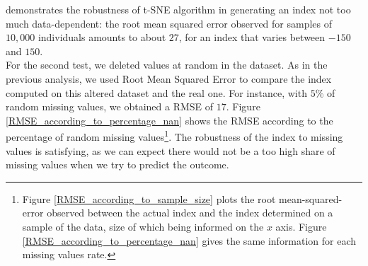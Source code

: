 \documentclass[]{article}
\begin{document}
demonstrates the robustness of t-SNE algorithm in generating an index not too much data-dependent: the root mean squared error observed for samples of $10,000$ individuals amounts to about $27$, for an index that varies between $-150$ and $150$.\\
For the second test, we deleted values at random in the dataset. As in the previous analysis, we used Root Mean Squared Error to compare the index computed on this altered dataset and the real one. For instance, with $5\%$ of random missing values, we obtained a RMSE of $17$. Figure \ref{RMSE_according_to_percentage_nan} shows the RMSE according to the percentage of random missing values\footnote{Figure \ref{RMSE_according_to_sample_size} plots the root mean-squared-error observed between the actual index and the index determined on a sample of the data, size of which being informed on the $x$ axis. Figure \ref{RMSE_according_to_percentage_nan} gives the same information for each missing values rate.}. The robustness of the index to missing values is satisfying, as we can expect there would not be a too high share of missing values when we try to predict the outcome.\\
\end{document}
